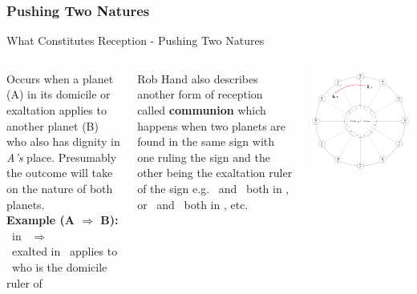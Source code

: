 \subsubsection{Pushing Two Natures}
\begin{frame}[t]{What Constitutes Reception - Pushing Two Natures}
\begin{columns}[T, onlytextwidth]
Occurs when a planet (A) in its domicile or exaltation applies to another planet (B) who also has dignity in \textsl{A's} place\footnotemark[1]. Presumably the outcome will take on the nature of both planets. \\
\vspace{0.25cm}
\textbf{Example (A $\Rightarrow$ B):} \Venus\ in \Pisces\ $\Rightarrow$ \Jupiter \\
\ul
\Venus\ exalted in \Pisces\ applies to \\
\Jupiter\ who is the domicile ruler of \Pisces \\
\vspace{0.25cm}

Rob Hand also describes another form of reception called \textbf{communion} which happens when two planets are found in the same sign with one ruling the sign and the other being the exaltation ruler of the sign e.g. \Moon\ and \Jupiter\ both in \Cancer, or \Mars\ and \Sun\ both in \Aries, etc.

\vspace{-0.5cm}
\begin{center}
{\includegraphics[width=\textwidth]{charts/01-pushing-two-natures}} \\
\end{center}

\end{columns}
\end{frame}

